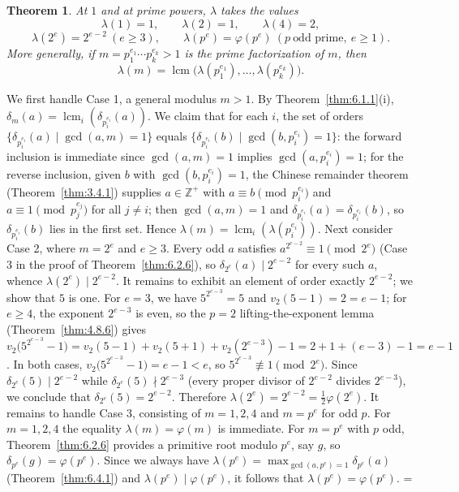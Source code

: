 \documentclass[11pt]{article}
\makeatletter
\let\nt@closedisplay\]
\def\nt@guardedclose{\@ifnextchar\par{\nt@closeafterpar}{\@ifnextchar\end{\postdisplaypenalty\@M\nt@closedisplay}{\nt@closedisplay}}}
\def\nt@closeafterpar\par{\@ifnextchar\par{\nt@closeafterpar}{\@ifnextchar\end{\postdisplaypenalty\@M\nt@closedisplay\par}{\nt@closedisplay\par}}}
\renewenvironment{proof}[1][\proofname]{\par
  \pushQED{\qed}\normalfont\topsep\medskipamount\edef\nt@afterproof{\@endparpenalty=\the\@endparpenalty\relax}\@beginparpenalty\@M\@endparpenalty\@M\let\]\nt@guardedclose\trivlist\item[]\textit{#1\@addpunct{.}} \ignorespaces}{\ifvmode\addpenalty\@M\fi\popQED\nt@afterproof\endtrivlist\@endpefalse}
\theoremstyle{ntstyle}
\newtheorem{theorem}{Theorem}[subsection]
\DeclareMathOperator{\lcm}{lcm}
\makeatother
\begin{document}
\begin{theorem}\label{thm:6.4.2} At $1$ and at prime powers, $\lambda$ takes the values
  \[
    \lambda(1)=1,\qquad \lambda(2)=1,\qquad \lambda(4)=2,
  \]
  \[
    \lambda(2^{e})=2^{e-2}\ (e\ge3),\qquad \lambda(p^{e})=\varphi(p^{e})\ (p\ \text{odd prime},\ e\ge1).
  \]
  More generally, if $m=p_1^{e_1}\cdots p_k^{e_k}>1$ is the prime
  factorization of $m$, then
  \[
    \lambda(m)=\lcm\big(\lambda(p_1^{e_1}),\ldots,\lambda(p_k^{e_k})\big).
  \]

\end{theorem}

\begin{proof} We first handle Case 1, a general modulus $m>1$. By
  Theorem~\ref{thm:6.1.1}(i), $\delta_m(a) = \lcm_i(\delta_{p_i^{e_i}}(a))$. We claim that for each
  $i$, the set of orders $\{\delta_{p_i^{e_i}}(a) \mid \gcd(a, m)=1\}$
  equals $\{\delta_{p_i^{e_i}}(b) \mid \gcd(b, p_i^{e_i})=1\}$: the forward
  inclusion is immediate since $\gcd(a, m)=1$ implies
  $\gcd(a, p_i^{e_i})=1$; for the reverse inclusion, given $b$ with
  $\gcd(b, p_i^{e_i})=1$, the Chinese remainder theorem (Theorem~\ref{thm:3.4.1}) supplies
  $a \in \mathbb{Z}^+$ with $a \equiv b \pmod{p_i^{e_i}}$ and $a \equiv 1 \pmod{p_j^{e_j}}$ for all $j \neq i$;
  then $\gcd(a, m)=1$ and
  $\delta_{p_i^{e_i}}(a) = \delta_{p_i^{e_i}}(b)$, so
  $\delta_{p_i^{e_i}}(b)$ lies in the first set. Hence $\lambda(m) = \lcm_i(\lambda(p_i^{e_i}))$. Next consider
  Case 2, where $m = 2^{e}$ and $e \ge 3$. Every odd $a$ satisfies
  $a^{2^{e-2}} \equiv 1 \pmod{2^e}$ (Case 3 in the proof of
  Theorem~\ref{thm:6.2.6}), so
  $\delta_{2^e}(a) \mid 2^{e-2}$ for every such $a$, whence
  $\lambda(2^e) \mid 2^{e-2}$. It remains to exhibit an element of
  order exactly $2^{e-2}$; we show that $5$ is one. For $e = 3$,
  we have $5^{2^{e-3}} = 5$ and $v_2(5-1) = 2 = e-1$; for $e \ge 4$, the exponent $2^{e-3}$
  is even, so the $p=2$ lifting-the-exponent lemma (Theorem~\ref{thm:4.8.6}) gives
  $v_2\big(5^{2^{e-3}} - 1\big) = v_2(5-1) + v_2(5+1) + v_2(2^{e-3}) - 1 = 2 + 1 + (e-3) - 1 = e-1$. In both cases,
  $v_2\big(5^{2^{e-3}} - 1\big) = e-1 < e$, so
  $5^{2^{e-3}} \not\equiv 1 \pmod{2^e}$. Since $\delta_{2^e}(5) \mid 2^{e-2}$ while $\delta_{2^e}(5) \nmid 2^{e-3}$
  (every proper divisor
  of $2^{e-2}$ divides $2^{e-3}$), we conclude that $\delta_{2^e}(5) = 2^{e-2}$. Therefore
  $\lambda(2^{e}) = 2^{e-2} = \tfrac{1}{2}\varphi(2^{e})$. It remains to handle Case 3, consisting of $m = 1,2,4$
  and $m=p^e$ for odd $p$. For $m=1,2,4$ the equality
  $\lambda(m)=\varphi(m)$ is immediate. For $m=p^e$ with $p$ odd,
  Theorem~\ref{thm:6.2.6} provides a primitive root modulo $p^e$, say $g$, so
  $\delta_{p^e}(g)=\varphi(p^e)$. Since we always have
  $\lambda(p^e)=\max_{\gcd(a, p^e)=1}\delta_{p^e}(a)$ (Theorem~\ref{thm:6.4.1}) and
  $\lambda(p^e)\mid\varphi(p^e)$, it follows that
  $\lambda(p^e)=\varphi(p^e)$.
\end{proof}
\end{document}
